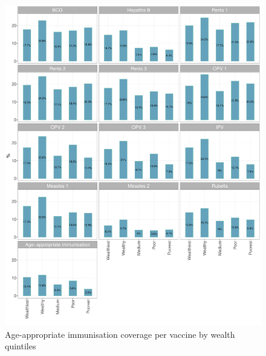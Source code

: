\documentclass[12pt,a4paper]{article}
\begin{document}
\begin{figure}[H]

{\centering \includegraphics{kayahReport_files/figure-latex/epi4aPlot-1} 

}

\caption{Age-appropriate immunisation coverage per vaccine by wealth quintiles}\label{fig:epi4aPlot}
\end{figure}
\end{document}
